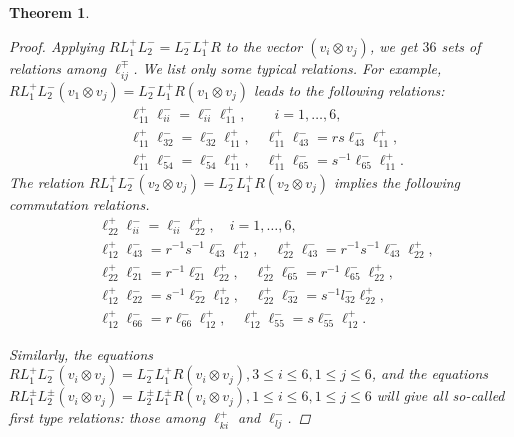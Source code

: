 \documentclass[10pt,a4paper]{amsart}
\newtheorem{theorem}{Theorem}
\numberwithin{equation}{section}
\begin{document}
\begin{theorem}
\begin{proof}
Applying $R L_1^{+} L_2^{-}=L_2^{-} L_1^{+}R$ to the vector $(v_i\otimes v_j)$,  we get $36$ sets of relations among $\ell^{\mp}_{ij}$.   We list only some typical relations.
For example, $R L_1^{+} L_2^{-}(v_1 \otimes v_j)=L_2^{-} L_1^{+} R(v_1 \otimes v_j)$ leads to the following relations:
\begin{align*}
&\ell_{11}^{+} \ell_{ii}^{-}=\ell_{ii}^{-} \ell_{11}^{+}, \qquad i=1, \ldots, 6,\\
&\ell_{11}^{+} \ell_{32}^{-}=\ell_{32}^{-} \ell_{11}^{+}, \quad \ell_{11}^{+} \ell_{43}^{-}=r s \ell_{43}^{-} \ell_{11}^{+},\\
&\ell_{11}^{+} \ell_{54}^{-}=\ell_{54}^{-} \ell_{11}^{+}, \quad \ell_{11}^{+} \ell_{65}^{-}=s^{-1} \ell_{65}^{-} \ell_{11}^{+}.
\end{align*}
The relation $R L_1^{+} L_2^{-}(v_2 \otimes v_j)=L_2^{-} L_1^{+} R(v_2 \otimes v_j)$ implies  the following commutation relations.
\begin{align*}
&\ell_{22}^{+} \ell_{i i}^{-}=\ell_{i i}^{-} \ell_{22}^{+}, \quad i=1, \ldots, 6,\\
&\ell_{12}^{+} \ell_{43}^{-}=r^{-1} s^{-1} \ell_{43}^{-} \ell_{12}^{+}, \quad \ell_{22}^{+} \ell_{43}^{-}=r^{-1} s^{-1} \ell_{43}^{-} \ell_{22}^{+},\\
&\ell_{22}^{+} \ell_{21}^{-}=r^{-1} \ell_{21}^{-} \ell_{22}^{+}, \quad \ell_{22}^{+} \ell_{65}^{-}=r^{-1} \ell_{65}^{-} \ell_{22}^{+},\\
&\ell_{12}^{+} \ell_{22}^{-}=s^{-1} \ell_{22}^{-} \ell_{12}^{+}, \quad \ell_{22}^{+} \ell_{32}^{-}=s^{-1} l_{32}^{-} \ell_{22}^{+},\\
&\ell_{12}^{+} \ell_{66}^{-}=r \ell_{66}^{-} \ell_{12}^{+}, \quad \ell_{12}^{+} \ell_{55}^{-}=s \ell_{55}^{-} \ell_{12}^{+}.
\end{align*}

Similarly, the equations $R L_1^{+} L_2^{-}\left(v_i \otimes v_j\right)=L_2^{-} L_1^{+} R\left(v_i \otimes v_j\right), 3 \leq i \leq 6,1 \leq j \leq 6$, and the equations $R L_1^{ \pm} L_2^{ \pm}\left(v_i \otimes v_j\right)=L_2^{ \pm} L_1^{ \pm} R\left(v_i \otimes v_j\right), 1 \leq i \leq 6,1 \leq j \leq 6$
will give all so-called first type relations: those among $\ell^+_{ki}$ and $\ell^-_{lj}$. %


\end{proof}
\end{theorem}
\end{document}
